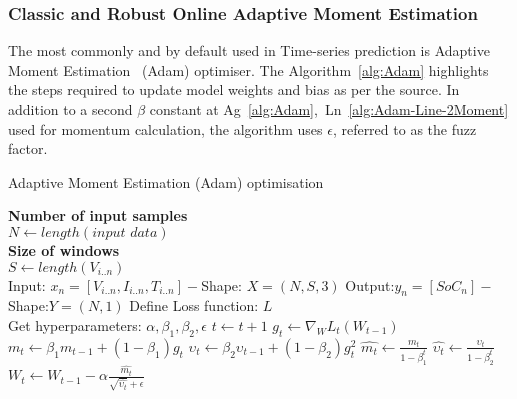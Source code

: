 %
\subsubsection{Classic and Robust Online Adaptive Moment Estimation}
The most commonly and by default used in Time-series prediction is Adaptive Moment Estimation~\cite{kingma_adam_2017} (Adam) optimiser.
The \mbox{Algorithm~\ref{alg:Adam}} highlights the steps required to update model weights and bias as per the source.
In addition to a second $\beta$ constant at \mbox{Ag~\ref{alg:Adam}, Ln~\ref{alg:Adam-Line-2Moment}} used for momentum calculation, the algorithm uses $\epsilon$, referred to as the fuzz factor.
\begin{algorithm}
  \caption{Adaptive Moment Estimation (Adam) optimisation}
  \begin{algorithmic}[1]
    \STATE \textbf{Number of input samples} \\ $N\gets length(\textit{input data})$\\
    \STATE \textbf{Size of windows} \\ $S\gets length(V_{i..n})$\\
    \STATE Input: $x_n = [V_{i..n}, I_{i..n}, T_{i..n}] - $Shape: $X = (N, S, 3)$
    \STATE Output:$y_n = [SoC_{n}] - $Shape:$Y = (N, 1)$
    \STATE Define Loss function: $L$ \\
           Get hyperparameters: $\alpha, \beta_1, \beta_2, \epsilon$
    \STATE $t \gets t+1$
    \STATE $g_t \gets \nabla_W L_t (W_{t-1})$ 
    \STATE $m_t \gets \beta_1 m_{t-1}+(1-\beta_1) g_t $ 
    \STATE $\upsilon_t \gets \beta_2 \upsilon_{t-1}+ \left(1-\beta_2 \right)g^2_t $ 
    \STATE $\hat{m_t} \gets \frac{m_t}{1-\beta^t_1}$ 
    \STATE $\hat{\upsilon_t} \gets \frac{\upsilon_t}{1-\beta^t_2} $ 
    \STATE $W_t \gets W_{t-1}- \alpha \frac{\hat{m_t}}{\sqrt{\hat{\upsilon_t}}+\epsilon} $ 
    \ENDWHILE
  \end{algorithmic}
  \label{alg:Adam}
\end{algorithm}

